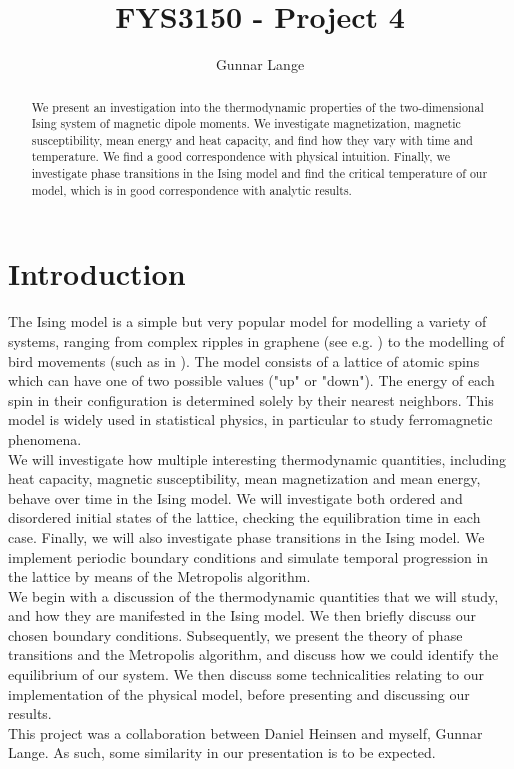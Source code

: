 \documentclass[a4paper, 10pt]{article}
\title{FYS3150 - Project 4}
\author{Gunnar Lange}
\begin{document}
\maketitle
\begin{abstract}
We present an investigation into the thermodynamic properties of the two-dimensional Ising system of magnetic dipole moments. We investigate magnetization, magnetic susceptibility, mean energy and heat capacity, and find how they vary with time and temperature. We find a good correspondence with physical intuition. Finally, we investigate phase transitions in the Ising model and find the critical temperature of our model, which is in good correspondence with analytic results.
\end{abstract}
\tableofcontents
\section{Introduction}
The Ising model is a simple but very popular model for modelling a variety of systems, ranging from complex ripples in graphene (see e.g. \cite{Graphene}) to the modelling of bird movements (such as in \cite{Birds}). The model consists of a lattice of atomic spins which can have one of two possible values ("up" or "down"). The energy of each spin in their configuration is determined solely by their nearest neighbors. This model is widely used in statistical physics, in particular to study ferromagnetic phenomena.\\
\linebreak
We will investigate how multiple interesting thermodynamic quantities, including heat capacity, magnetic susceptibility, mean magnetization and mean energy, behave over time in the Ising model. We will investigate both ordered and disordered initial states of the lattice, checking the equilibration time in each case. Finally, we will also investigate phase transitions in the Ising model. We implement periodic boundary conditions and simulate temporal progression in the lattice by means of the Metropolis algorithm.\\
\linebreak
We begin with a discussion of the thermodynamic quantities that we will study, and how they are manifested in the Ising model. We then briefly discuss our chosen boundary conditions. Subsequently, we present the theory of phase transitions and the Metropolis algorithm, and discuss how we could identify the equilibrium of our system. We then discuss some technicalities relating to our implementation of the physical model, before presenting and discussing our results.\\
\linebreak
This project was a collaboration between Daniel Heinsen and myself, Gunnar Lange. As such, some similarity in our presentation is to be expected.
\end{document}
